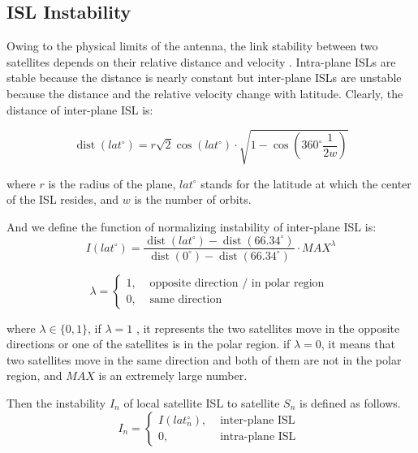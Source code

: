 \subsection{ISL Instability}
Owing to the physical limits of the antenna, the link stability between two  satellites depends on their relative distance and velocity \cite{ISL1}\cite{ISL2}.
Intra-plane ISLs are stable because the distance is nearly constant but inter-plane ISLs are unstable because the distance and the relative velocity change with latitude. Clearly, the distance of inter-plane ISL is: 

\begin{equation}
 \operatorname{dist}\left(l a t^{\circ}\right)=r \sqrt{2} \cos \left(l a t^{\circ}\right) \cdot \sqrt{1-\cos \left(360^{\circ} \frac{1}{2 w}\right)} 
 \label{eq:INTERISL}
\end{equation}

where $r$ is the radius of the plane, $lat^{\circ}$ stands for the latitude at which the center of the ISL resides, and $w$ is the number of orbits.

And we define the function of normalizing instability of inter-plane ISL is:
\begin{equation}
 I\left(l a t^{\circ}\right)=\frac{\operatorname{dist}\left(l a t^{\circ}\right)-\operatorname{dist}\left(66.34^{\circ}\right)}{\operatorname{dist}\left(0^{\circ}\right)-\operatorname{dist}\left(66.34^{\circ}\right)} \cdot M A X^{\lambda} 
 \label{eq:NORMALIZEDINSTABILITY}
\end{equation}

\begin{equation}
 \lambda=\left\{\begin{array}{ll}1, & \text { opposite direction / in polar region } \\ 0, & \text { same direction }\end{array}\right. 
\end{equation}

where $\lambda \in \{0,1\}$, if $\lambda = 1$ , it represents the two satellites move in the opposite directions or one of the satellites is in the polar region. if $\lambda = 0$, it means that two satellites move in the same direction and both of them are not in the polar region, and $MAX$ is an extremely large number.

Then the instability $I_n$ of local satellite ISL to satellite $S_n$ is defined as follows. 
\begin{equation}
 I_{n}=\left\{\begin{array}{ll}I\left(l a t_{n}^{\circ}\right), & \text { inter-plane ISL } \\ 0, & \text { intra-plane ISL }\end{array}\right. 
 \label{eq:INSTABILITY}
\end{equation}

